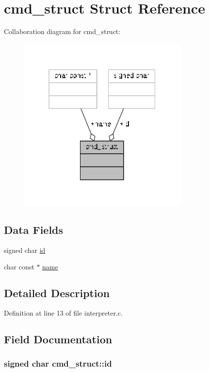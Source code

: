 \hypertarget{structcmd__struct}{\section{cmd\-\_\-struct Struct Reference}
\label{structcmd__struct}
}


Collaboration diagram for cmd\-\_\-struct\-:
\nopagebreak
\begin{figure}[H]
\begin{center}
\leavevmode
\includegraphics[width=244pt]{structcmd__struct__coll__graph}
\end{center}
\end{figure}
\subsection*{Data Fields}
\begin{DoxyCompactItemize}
\item 
signed char \hyperlink{structcmd__struct_aef60eff615b829ce802d4c60aef7b9d2}{id}
\item 
char const $\ast$ \hyperlink{structcmd__struct_a35071dc464890b0c7aa50fa6d8cab54c}{name}
\end{DoxyCompactItemize}


\subsection{Detailed Description}


Definition at line 13 of file interpreter.\-c.



\subsection{Field Documentation}
\hypertarget{structcmd__struct_aef60eff615b829ce802d4c60aef7b9d2}{
\subsubsection[{id}]{\setlength{\rightskip}{0pt plus 5cm}signed char cmd\-\_\-struct\-::id}}\label{structcmd__struct_aef60eff615b829ce802d4c60aef7b9d2}


